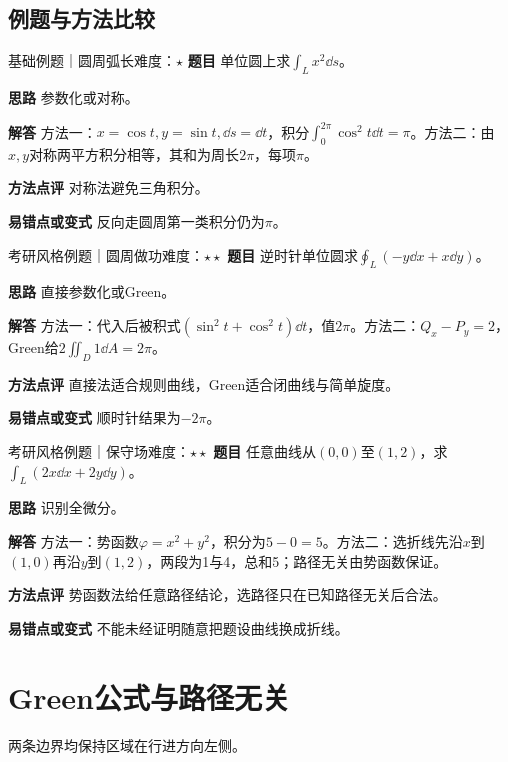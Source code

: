 \subsection{例题与方法比较}
\begin{example}{基础例题｜圆周弧长}{难度：$\star$}
\label{ex:8:1}\textbf{题目} 单位圆上求$\int_Lx^2\dd s$。\par
\textbf{思路} 参数化或对称。\par
\textbf{解答} 方法一：$x=\cos t,y=\sin t,\dd s=\dd t$，积分$\int_0^{2\pi}\cos^2t\dd t=\pi$。方法二：由$x,y$对称两平方积分相等，其和为周长$2\pi$，每项$\pi$。\par
\textbf{方法点评} 对称法避免三角积分。\par
\textbf{易错点或变式} 反向走圆周第一类积分仍为$\pi$。
\end{example}
\begin{example}{考研风格例题｜圆周做功}{难度：$\star\star$}
\label{ex:8:2}\textbf{题目} 逆时针单位圆求$\oint_L(-y\dd x+x\dd y)$。\par
\textbf{思路} 直接参数化或Green。\par
\textbf{解答} 方法一：代入后被积式$(\sin^2t+\cos^2t)\dd t$，值$2\pi$。方法二：$Q_x-P_y=2$，Green给$2\iint_D1\dd A=2\pi$。\par
\textbf{方法点评} 直接法适合规则曲线，Green适合闭曲线与简单旋度。\par
\textbf{易错点或变式} 顺时针结果为$-2\pi$。
\end{example}
\begin{example}{考研风格例题｜保守场}{难度：$\star\star$}
\label{ex:8:3}\textbf{题目} 任意曲线从$(0,0)$至$(1,2)$，求$\int_L(2x\dd x+2y\dd y)$。\par
\textbf{思路} 识别全微分。\par
\textbf{解答} 方法一：势函数$\varphi=x^2+y^2$，积分为$5-0=5$。方法二：选折线先沿$x$到$(1,0)$再沿$y$到$(1,2)$，两段为1与4，总和5；路径无关由势函数保证。\par
\textbf{方法点评} 势函数法给任意路径结论，选路径只在已知路径无关后合法。\par
\textbf{易错点或变式} 不能未经证明随意把题设曲线换成折线。
\end{example}
\section{Green公式与路径无关}\label{sec:8:2}

\begin{center}\par\small 两条边界均保持区域在行进方向左侧。
\end{center}

